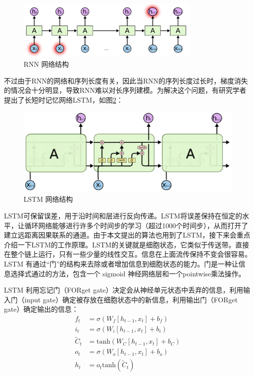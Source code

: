 \begin{figure}[!htbp]
\vspace{1em}
\centering
  \includegraphics[width=0.8\textwidth]{figures/RNN.png}
  \caption{RNN 网络结构}
  \label{fig:RNN}       %
\vspace{1em}
\end{figure}


不过由于RNN的网络和序列长度有关，因此当RNN的序列长度过长时，梯度消失的情况会十分明显，导致RNN难以对长序列建模。为解决这个问题，有研究学者提出了长短时记忆网络LSTM\cite{Hochreiter1997LongSM}，如图\ref{fig:LSTM}：
\begin{figure}[!htbp]
\vspace{1em}
\centering
  \includegraphics[width=0.8\linewidth]{figures/LSTM.png}
  \caption{LSTM 网络结构}
  \label{fig:LSTM}       %
\vspace{1em}
\end{figure}

LSTM可保留误差，用于沿时间和层进行反向传递。LSTM将误差保持在恒定的水平，让循环网络能够进行许多个时间步的学习（超过1000个时间步），从而打开了建立远距离因果联系的通道。由于本文提出的算法也用到了LSTM，接下来会重点介绍一下LSTM的工作原理。LSTM的关键就是细胞状态，它类似于传送带。直接在整个链上运行，只有一些少量的线性交互。信息在上面流传保持不变会很容易。LSTM 有通过“门”的结构来去除或者增加信息到细胞状态的能力。门是一种让信息选择式通过的方法，包含一个 sigmoid 神经网络层和一个pointwise乘法操作。

LSTM 利用忘记门（FORget gate）决定会从神经单元状态中丢弃的信息，利用输入门（input gate）确定被存放在细胞状态中的新信息，利用输出门（FORget gate）确定输出的信息：
\begin{equation}
\label{LSTM_eq}
\begin{aligned}
f_t&=\sigma(W_f[h_{t-1}, x_t] + b_f) \\
i_t&=\sigma(W_i[h_{t-1}, x_t] + b_i)\\
\tilde{C}_t &= \text{tanh}(W_C[h_{t-1}, x_t] + b_C)\\
o_t&=\sigma(W_o[h_{t-1}, x_t] + b_o)\\
h_t&=o_t\text{tanh}(\tilde{C}_t)
\end{aligned}
\end{equation}

